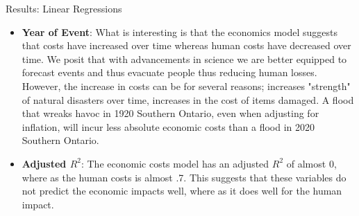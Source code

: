 \begin{frame}{Results: Linear Regressions}
\begin{itemize}

	\item \textbf{Year of Event}: What is interesting is that the economics model suggests that costs have increased over time whereas human costs have decreased over time. We posit that with advancements in science we are better equipped to forecast events and thus evacuate people thus reducing human losses. However, the increase in costs can be for several reasons; increases "strength" of natural disasters over time, increases in the cost of items damaged. A flood that wreaks havoc in 1920 Southern Ontario, even when adjusting for inflation, will incur less absolute economic costs than a flood in 2020 Southern Ontario.
	\item \textbf{Adjusted $R^2$}: The economic costs model has an adjusted $R^2$ of almost 0, where as the human costs is almost .7. This suggests that these variables do not predict the economic impacts well, where as it does well for the human impact.
\end{itemize}
\end{frame}

